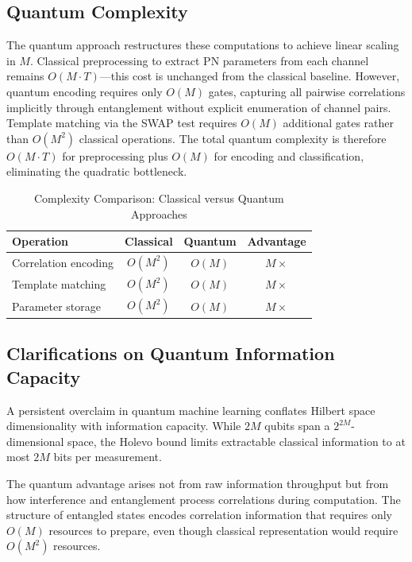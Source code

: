 \documentclass[11pt,a4paper]{article}
\begin{document}
\subsection{Quantum Complexity}

The quantum approach restructures these computations to achieve linear scaling in $M$. Classical preprocessing to extract PN parameters from each channel remains $O(M \cdot T)$---this cost is unchanged from the classical baseline. However, quantum encoding requires only $O(M)$ gates, capturing all pairwise correlations implicitly through entanglement without explicit enumeration of channel pairs. Template matching via the SWAP test requires $O(M)$ additional gates rather than $O(M^2)$ classical operations. The total quantum complexity is therefore $O(M \cdot T)$ for preprocessing plus $O(M)$ for encoding and classification, eliminating the quadratic bottleneck.

\begin{table}[htbp]
\centering
\caption{Complexity Comparison: Classical versus Quantum Approaches}
\label{tab:complexity}
\begin{tabular}{lccc}
\toprule
Operation & Classical & Quantum & Advantage \\
\midrule
Correlation encoding & $O(M^2)$ & $O(M)$ & $M\times$ \\
Template matching & $O(M^2)$ & $O(M)$ & $M\times$ \\
Parameter storage & $O(M^2)$ & $O(M)$ & $M\times$ \\
\bottomrule
\end{tabular}
\end{table}

\subsection{Clarifications on Quantum Information Capacity}

A persistent overclaim in quantum machine learning conflates Hilbert space dimensionality with information capacity. While $2M$ qubits span a $2^{2M}$-dimensional space, the Holevo bound \citep{holevo1973} limits extractable classical information to at most $2M$ bits per measurement.

The quantum advantage arises not from raw information throughput but from how interference and entanglement process correlations during computation. The structure of entangled states encodes correlation information that requires only $O(M)$ resources to prepare, even though classical representation would require $O(M^2)$ resources.
\end{document}
